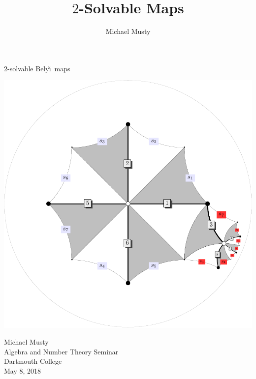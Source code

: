 \documentclass[xcolor=dvipsnames]{beamer}
\title{$2$-Solvable \Belyi Maps}
\author{Michael Musty}
\date{}
\theoremstyle{plain}
\newcommand{\Belyi}{Bely\u{\i}}
\begin{document}
  \begin{frame}[plain]
    \begin{center}{
      \Huge\color{SeaGreen}
      $2$-solvable
      \Belyi\ maps
    }
    \end{center}
    \begin{center}
      \includegraphics[scale = 0.3]{8T5-g2.pdf}
    \end{center}
    \begin{center}
      Michael Musty\\
      Algebra and Number Theory Seminar\\
      Dartmouth College\\
      May 8, 2018
    \end{center}
  \end{frame}
\end{document}
